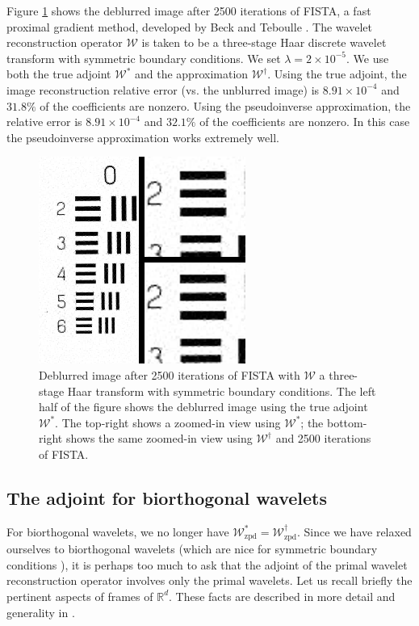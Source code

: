 \documentclass[journal]{IEEEtran}
\newcommand{\reals}{\mathbb{R}}
\begin{document}
Figure \ref{fig:compare_db1_sym} shows the deblurred image after 2500 iterations of FISTA, a fast proximal gradient method, developed by Beck and Teboulle \cite{beck_2009}.  The wavelet reconstruction operator $\mathcal{W}$ is taken to be a three-stage Haar discrete wavelet transform with symmetric boundary conditions.  We set $\lambda=2\times 10^{-5}$.  We use both the true adjoint $\mathcal{W}^\ast$ and the approximation $\mathcal{W}^\dagger$.  Using the true adjoint, the image reconstruction relative error (vs. the unblurred image) is $8.91\times10^{-4}$ and $31.8\%$ of the coefficients are nonzero.  Using the pseudoinverse approximation, the relative error is $8.91\times 10^{-4}$ and $32.1\%$ of the coefficients are nonzero.  In this case the pseudoinverse approximation works extremely well.

\begin{figure}
   \centering
   \includegraphics[width=0.8\columnwidth]{figures/compare_db1_sym_2500.png}
   \caption{Deblurred image after 2500 iterations of FISTA with $\mathcal{W}$ a three-stage Haar transform with symmetric boundary conditions.  The left half of the figure shows the deblurred image using the true adjoint $\mathcal{W}^\ast$.  The top-right shows a zoomed-in view using $\mathcal{W}^\ast$; the bottom-right shows the same zoomed-in view using $\mathcal{W}^\dagger$ and 2500 iterations of FISTA.}
   \label{fig:compare_db1_sym}
\end{figure}


\subsection{The adjoint for biorthogonal wavelets}
For biorthogonal wavelets, we no longer have $\mathcal{W}_\text{zpd}^\ast=\mathcal{W}_\text{zpd}^\dagger$.  Since we have relaxed ourselves to biorthogonal wavelets (which are nice for symmetric boundary conditions \cite{rout_2003}), it is perhaps too much to ask that the adjoint of the primal wavelet reconstruction operator involves only the primal wavelets.  Let us recall briefly the pertinent aspects of frames of $\reals^d$.  These facts are described in more detail and generality in \cite{mallat_2009}.
\end{document}
